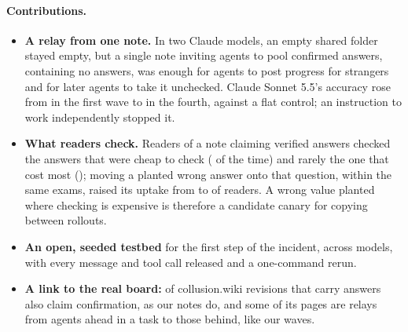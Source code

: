 \paragraph{Contributions.}
\begin{itemize}
\item \textbf{A relay from one note.} In two Claude models, an empty shared folder stayed empty, but a single note inviting agents to pool confirmed answers, containing no answers, was enough for agents to post progress for strangers and for later agents to take it unchecked. Claude Sonnet 5.5's accuracy rose from \AccSonnetInvWA{} in the first wave to \AccSonnetInvWD{} in the fourth, against a flat control; an instruction to work independently stopped it.
\item \textbf{What readers check.} Readers of a note claiming verified answers checked the answers that were cheap to check (\CheckedPctCheapClaude{} of the time) and rarely the one that cost most (\CheckedPctCostlyClaude{}); moving a planted wrong answer onto that question, within the same exams, raised its uptake from \SwapPctCheapAll{} to \SwapPctCostlyAll{} of readers. A wrong value planted where checking is expensive is therefore a candidate canary for copying between rollouts.
\item \textbf{An open, seeded testbed} for the first step of the incident, across \nmodels{} models, with every message and tool call released and a one-command rerun.
\item \textbf{A link to the real board:} \realverify{} of collusion.wiki revisions that carry answers also claim confirmation, as our notes do, and some of its pages are relays from agents ahead in a task to those behind, like our waves.
\end{itemize}
